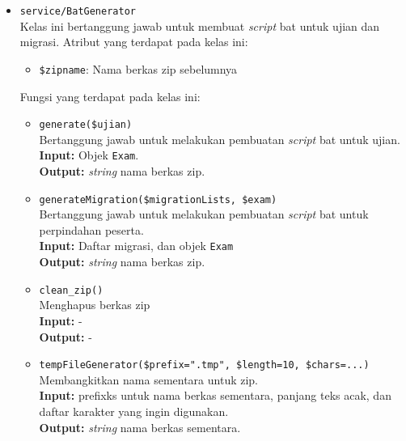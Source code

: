     \begin{itemize}
        \item \texttt{service/BatGenerator} \\
            Kelas ini bertanggung jawab untuk membuat \textit{script} bat untuk
            ujian dan migrasi.
            Atribut yang terdapat pada kelas ini:
            \begin{itemize}
                \item \texttt{\$zipname}: Nama berkas zip sebelumnya
            \end{itemize}
            Fungsi yang terdapat pada kelas ini:
            \begin{itemize}
                \item \texttt{generate(\$ujian)} \\
                    Bertanggung jawab untuk melakukan pembuatan \textit{script} bat untuk ujian. \\
                    \textbf{Input:} Objek \texttt{Exam}.\\
                    \textbf{Output:} \textit{string} nama berkas zip.
                
                \item \texttt{generateMigration(\$migrationLists, \$exam)} \\
                    Bertanggung jawab untuk melakukan pembuatan \textit{script} bat untuk perpindahan
                    peserta.\\
                    \textbf{Input:} Daftar migrasi, dan objek \texttt{Exam}\\
                    \textbf{Output:} \textit{string} nama berkas zip.
                
                \item \texttt{clean\_zip()} \\
                    Menghapus berkas zip \\
                    \textbf{Input:} -\\
                    \textbf{Output:} -
                
                \item \texttt{tempFileGenerator(\$prefix=".tmp", \$length=10, \$chars=...)} \\
                    Membangkitkan nama sementara untuk zip. \\
                    \textbf{Input:} prefixks untuk nama berkas sementara, panjang teks acak, dan
                        daftar karakter yang ingin digunakan.\\
                    \textbf{Output:} \textit{string} nama berkas sementara.
            \end{itemize}
        

\end{itemize}
